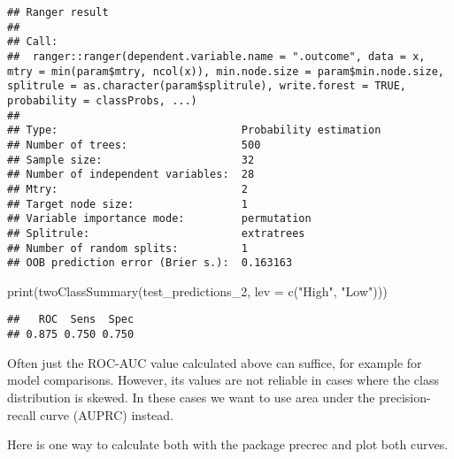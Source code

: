 \documentclass[
  oneside]{book}
\newenvironment{Shaded}{\begin{snugshade}}{\end{snugshade}}
\newcommand{\AttributeTok}[1]{\textcolor[rgb]{0.77,0.63,0.00}{#1}}
\newcommand{\FunctionTok}[1]{\textcolor[rgb]{0.00,0.00,0.00}{#1}}
\newcommand{\NormalTok}[1]{#1}
\newcommand{\OtherTok}[1]{\textcolor[rgb]{0.56,0.35,0.01}{#1}}
\newcommand{\SpecialCharTok}[1]{\textcolor[rgb]{0.00,0.00,0.00}{#1}}
\newcommand{\StringTok}[1]{\textcolor[rgb]{0.31,0.60,0.02}{#1}}
\begin{document}
\begin{Shaded}
\end{Shaded}

\begin{verbatim}
## Ranger result
## 
## Call:
##  ranger::ranger(dependent.variable.name = ".outcome", data = x,      mtry = min(param$mtry, ncol(x)), min.node.size = param$min.node.size,      splitrule = as.character(param$splitrule), write.forest = TRUE,      probability = classProbs, ...) 
## 
## Type:                             Probability estimation 
## Number of trees:                  500 
## Sample size:                      32 
## Number of independent variables:  28 
## Mtry:                             2 
## Target node size:                 1 
## Variable importance mode:         permutation 
## Splitrule:                        extratrees 
## Number of random splits:          1 
## OOB prediction error (Brier s.):  0.163163
\end{verbatim}

\begin{Shaded}
\begin{Highlighting}[]
\FunctionTok{print}\NormalTok{(}\FunctionTok{twoClassSummary}\NormalTok{(test\_predictions\_2, }\AttributeTok{lev =} \FunctionTok{c}\NormalTok{(}\StringTok{"High"}\NormalTok{, }\StringTok{"Low"}\NormalTok{)))}
\end{Highlighting}
\end{Shaded}

\begin{verbatim}
##   ROC  Sens  Spec 
## 0.875 0.750 0.750
\end{verbatim}

Often just the ROC-AUC value calculated above can suffice, for example for
model comparisons. However, its values are not reliable in cases where the class
distribution is skewed. In these cases we want to use area under the precision-recall curve
(AUPRC) instead.

Here is one way to calculate both with the package precrec and plot both curves.

\begin{Shaded}
\end{Shaded}
\end{document}
